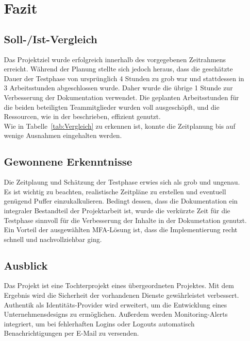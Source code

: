 \section{Fazit} 
\label{sec:Fazit}

\subsection{Soll-/Ist-Vergleich}
\label{sec:SollIstVergleich}
Das Projektziel wurde erfolgreich innerhalb des vorgegebenen Zeitrahmens erreicht. Während der Planung stellte sich jedoch heraus, dass die 
geschätzte Dauer der Testphase von ursprünglich 4 Stunden zu grob war und stattdessen in 3 Arbeitsstunden abgeschlossen wurde. Daher wurde die 
übrige 1 Stunde zur Verbesserung der Dokumentation verwendet. Die geplanten Arbeitsstunden für die beiden beteiligten Teammitglieder 
wurden voll ausgeschöpft, und die Ressourcen, wie in der  beschrieben, effizient genutzt.
\\Wie in Tabelle~\ref{tab:Vergleich}  zu erkennen ist, konnte die Zeitplanung bis auf wenige Ausnahmen eingehalten werden.

\subsection{Gewonnene Erkenntnisse}
\label{sec:Gewonnene Erkenntnisse}
Die Zeitplaung und Schätzung der Testphase erwies sich als grob und ungenau. Es ist wichtig zu beachten, realistische Zeitpläne zu erstellen 
und eventuell genügend Puffer einzukalkulieren. Bedingt dessen, dass die Dokumentation ein integraler Bestandteil der Projektarbeit ist, 
wurde die verkürzte Zeit für die Testphase sinnvoll für die Verbesserung der Inhalte in der Dokumetation genutzt. Ein Vorteil der 
ausgewählten \acs{MFA}-Lösung ist, dass die Implementierung recht schnell und nachvollziehbar ging.

\subsection{Ausblick}
\label{sec:Ausblick}
Das Projekt ist eine Tochterprojekt eines übergeordneten Projektes. Mit dem Ergebnis wird die Sicherheit der vorhandenen Dienste gewährleistet 
\bzw verbessert. Authentik als Identitäts-Provider wird erweitert, um die Entwicklung eines Unternehmensdesigns zu ermöglichen. 
Außerdem werden Monitoring-Alerts integriert, um bei fehlerhaften Logins oder Logouts automatisch Benachrichtigungen per E-Mail zu versenden.
